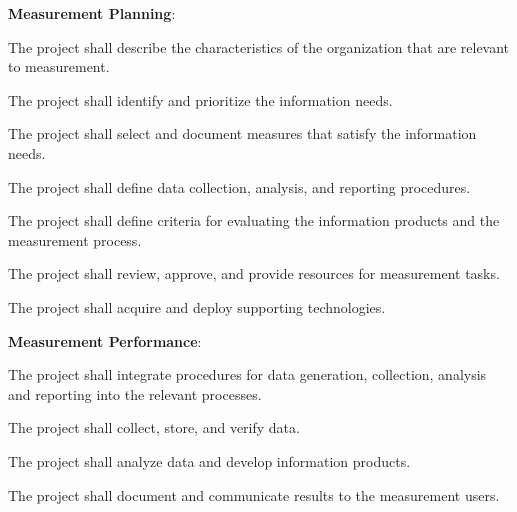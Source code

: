 			\begin{adjustwidth}{2em}{0pt} 

				\begin{compactenum}

					\item {\bf Measurement Planning}:

					\begin{compactenum}

						\item The project shall describe the characteristics of the organization that are relevant to measurement.

						\item The project shall identify and prioritize the information needs.

						\item The project shall select and document measures that satisfy the information needs.

						\item The project shall define data collection, analysis, and reporting procedures.

						\item The project shall define criteria for evaluating the information products and the measurement process.

						\item The project shall review, approve, and provide resources for measurement tasks.

						\item The project shall acquire and deploy supporting technologies.

					\end{compactenum}

					\item {\bf Measurement Performance}:

					\begin{compactenum}

						\item The project shall integrate procedures for data generation, collection, analysis and reporting into the relevant processes.

						\item The project shall collect, store, and verify data.

						\item The project shall analyze data and develop information products.

						\item The project shall document and communicate results to the measurement users.


\end{compactenum}
\end{compactenum}
\end{adjustwidth}
